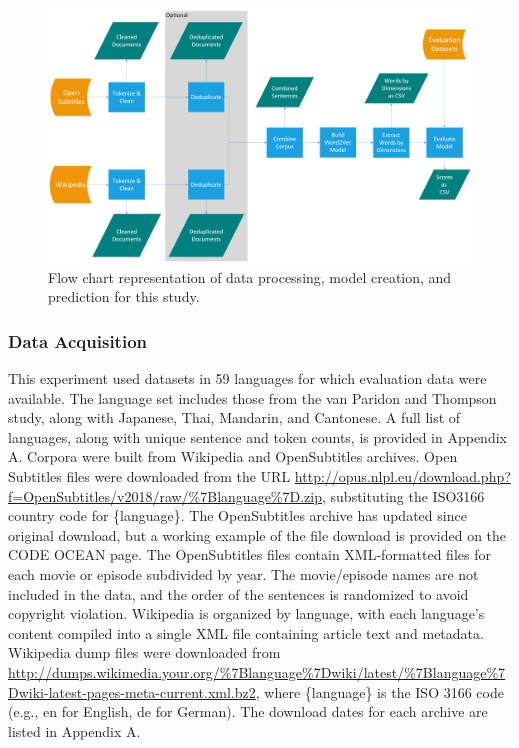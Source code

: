\documentclass[
  man,floatsintext]{apa6}
\begin{document}
\begin{figure}
\includegraphics[width=1\linewidth]{figures/process_flow} \caption{Flow chart representation of data processing, model creation, and prediction for this study.}\label{fig:tech-details}
\end{figure}

\subsubsection{Data Acquisition}\label{data-acquisition}

This experiment used datasets in 59 languages for which evaluation data were available. The language set includes those from the van Paridon and Thompson study, along with Japanese, Thai, Mandarin, and Cantonese. A full list of languages, along with unique sentence and token counts, is provided in Appendix A. Corpora were built from Wikipedia and OpenSubtitles archives. Open Subtitles files were downloaded from the URL \url{http://opus.nlpl.eu/download.php?f=OpenSubtitles/v2018/raw/\%7Blanguage\%7D.zip}, substituting the ISO3166 country code for \{language\}. The OpenSubtitles archive has updated since original download, but a working example of the file download is provided on the CODE OCEAN page. The OpenSubtitles files contain XML-formatted files for each movie or episode subdivided by year. The movie/episode names are not included in the data, and the order of the sentences is randomized to avoid copyright violation. Wikipedia is organized by language, with each language's content compiled into a single XML file containing article text and metadata. Wikipedia dump files were downloaded from \url{http://dumps.wikimedia.your.org/\%7Blanguage\%7Dwiki/latest/\%7Blanguage\%7Dwiki-latest-pages-meta-current.xml.bz2}, where \{language\} is the ISO 3166 code (e.g., en for English, de for German). The download dates for each archive are listed in Appendix A.
\end{document}
